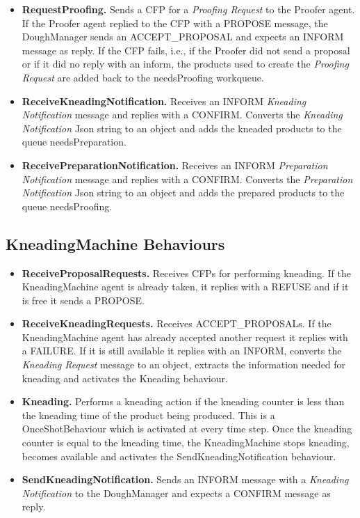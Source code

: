 \documentclass[paper=a4, fontsize=11pt]{scrartcl}
\begin{document}
\begin{itemize}
		\item \textbf{RequestProofing.} Sends a CFP for a \textit{Proofing Request} to the Proofer agent. If the Proofer agent replied to the CFP with a PROPOSE message, the DoughManager
		sends an ACCEPT\_PROPOSAL and expects an INFORM message as reply. If the CFP fails, i.e., if the Proofer did not send a proposal or if it did no reply with an inform, the products used to create the \textit{Proofing Request} are added back to the needsProofing workqueue.

		\item \textbf{ReceiveKneadingNotification.} Receives an INFORM \textit{Kneading Notification} message and replies with a CONFIRM. Converts the \textit{Kneading Notification} Json string to an object and adds the kneaded products to the queue needsPreparation.

		\item \textbf{ReceivePreparationNotification.} Receives an INFORM \textit{Preparation Notification} message and replies with a CONFIRM. Converts the \textit{Preparation Notification} Json string to an object and adds the prepared products to the queue needsProofing.

	\end{itemize}

	\subsection*{KneadingMachine Behaviours}

	\begin{itemize}
		\item \textbf{ReceiveProposalRequests.} Receives CFPs for performing kneading. If the KneadingMachine agent is already taken, it replies with a REFUSE and if it is free it sends a PROPOSE.

		\item \textbf{ReceiveKneadingRequests.} Receives ACCEPT\_PROPOSALs.  If the KneadingMachine agent has already accepted another request it replies with a FAILURE. If it is still available it replies with an INFORM, converts the \textit{Kneading Request} message to an object, extracts the information needed for kneading and activates the Kneading behaviour.

		\item \textbf{Kneading.} Performs a kneading action if the kneading counter is less than the kneading time of the product being produced. This is a OnceShotBehaviour which is activated at every time step. Once the kneading counter is equal to the kneading time, the KneadingMachine stops kneading, becomes available and activates the SendKneadingNotification behaviour.

		\item \textbf{SendKneadingNotification.} Sends an INFORM message with a \textit{Kneading Notification} to the DoughManager and expects a CONFIRM message as reply.
	\end{itemize}
\end{document}
